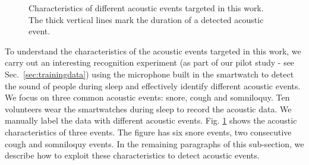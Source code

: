 \begin{figure}[!t]
\centering
\caption{Characteristics of different acoustic events targeted in this work. The thick vertical lines mark the duration of a detected acoustic event.}\label{acoustic}
\end{figure}



 To understand the characteristics of the acoustic events targeted in this work,  we carry out
an interesting recognition experiment (as part of our pilot study - see Sec.~\ref{sec:trainingdata}) using the microphone built in
the smartwatch to detect the sound of people during sleep and effectively identify different acoustic events. We focus on three common acoustic
events: snore, cough and somniloquy. Ten volunteers wear the smartwatches during sleep to record the acoustic data. We manually label the
data with different acoustic events. Fig. \ref{acoustic} shows the acoustic characteristics of three events. The figure has six snore
events, two consecutive cough and somniloquy events. In the remaining paragraphs of this sub-section, we describe how to exploit these
characteristics to detect acoustic events.



